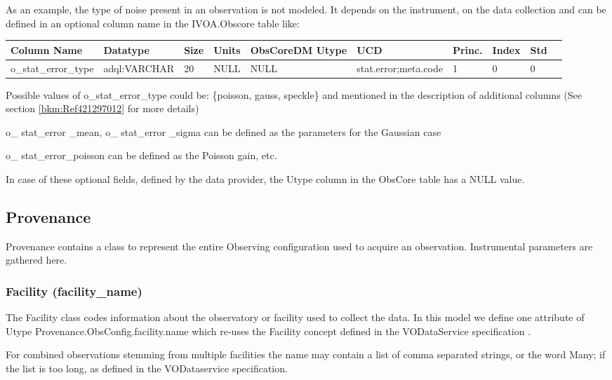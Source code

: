 \documentclass[11pt,a4paper]{ivoa}
\begin{document}
As an example, the type of noise present in an observation is not modeled. It depends on the instrument, on the data
collection and can be defined in an optional column name in the IVOA.Obscore table like:

\begin{tabular}{|l|p{}|p{}|p{}|p{}|
  p{}|p{}|p{}|p{}|p{}|}
\hline
Column Name & Datatype & Size & Units & ObsCoreDM Utype & UCD & Princ. & Index & Std\\\hline
o\_stat\_error\_type   & adql:VARCHAR   & 20 & NULL & NULL & stat.error;meta.code & 1 & 0 & 0\\\hline
\end{tabular}

Possible values of o\_stat\_error\_type could be: \{poisson, gauss, speckle\} and mentioned in the description of
additional columns (See section \ref{bkm:Ref421297012} for more details)

o\_ stat\_error \_mean, o\_ stat\_error \_sigma can be defined as the parameters for the Gaussian case

o\_ stat\_error\_poisson can be defined as the Poisson gain, etc.

In case of these optional fields, defined by the data provider, the Utype column in the ObsCore table has a NULL value.

\subsection{Provenance}
\label{bkm:Ref482804135}Provenance contains a class to represent the entire Observing configuration used to acquire an
observation.  Instrumental parameters are gathered here.

\subsubsection{Facility (facility\_name)}
The Facility class codes information about the observatory or facility used to collect the data. In this model we define
one attribute of Utype Provenance.ObsConfig.facility.name which re-uses the Facility concept defined in the
VODataService specification \citep{2010ivoa.spec.1202P}. 

 For combined observations stemming from multiple facilities the name may contain a list of comma separated strings, or
the word {\textquotedbl}Many{\textquotedbl}; if the list is too long, as defined in the VODataservice specification. 
\end{document}
